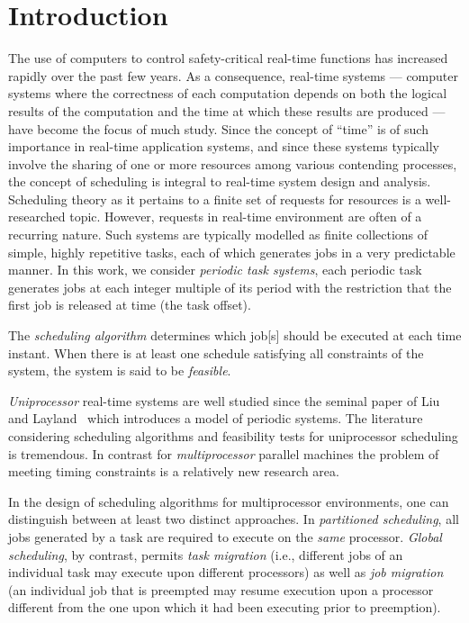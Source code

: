 \documentclass[a4paper,11pt]{article}
\begin{document}
\section{Introduction} \label{intro} The use of computers to control
safety-critical real-time functions has increased rapidly over the
past few years. As a consequence, real-time systems --- computer
systems where the correctness of each computation depends on both the
logical results of the computation and the time at which these results
are produced --- have become the focus of much study. Since the
concept of ``time'' is of such importance in real-time application
systems, and since these systems typically involve the sharing of one
or more resources among various contending processes, the concept of
scheduling is integral to real-time system design and
analysis. Scheduling theory as it pertains to a finite set of requests
for resources is a well-researched topic. However, requests in
real-time environment are often of a recurring nature. Such systems
are typically modelled as finite collections of simple, highly
repetitive tasks, each of which generates jobs in a very predictable
manner. In this work, we consider \emph{periodic task systems}, each periodic 
task  generates jobs at each integer multiple of its period  with the restriction that the first job is released at time  (the task
offset).



The \emph{scheduling algorithm} determines which job[s] should be
executed at each time instant. When there is at least one schedule
satisfying all constraints of the system, the system is said to be
\emph{feasible}.

\emph{Uniprocessor} real-time systems are well studied since the
seminal paper of Liu and Layland~\cite{Liu} which introduces a model
of periodic systems. The literature considering scheduling algorithms
and feasibility tests for uniprocessor scheduling is tremendous. In
contrast for \emph{multiprocessor} parallel machines the problem of
meeting timing constraints is a relatively new research area.



In the design of scheduling algorithms for multiprocessor environments,
one can distinguish between at least two distinct approaches. In
\emph{partitioned scheduling}, all jobs generated by a task are
required to execute on the \emph{same} processor. \emph{Global scheduling},
by contrast, permits \emph{task migration} (i.e., different jobs of an
individual task may execute upon different processors) as well as \emph{job
migration} (an individual job that is preempted may resume execution
upon a processor different from the one upon which it had been
executing prior to preemption).
\end{document}

